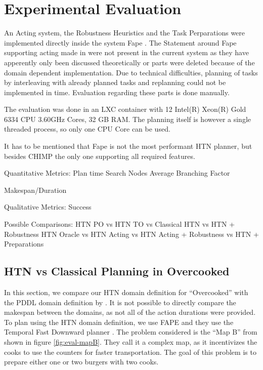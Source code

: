 \section{Experimental Evaluation}\label{sec:evaluation}

An Acting system, the Robustness Heuristics and the Task Perparations were implemented directly inside the system Fape \citep{bit-monnotFAPEConstraintbasedPlanner2020}.
The Statement around Fape supporting acting made in \cite{bit-monnotTemporalHierarchicalModels2016a} were not present in the current system as they have apperently only been discussed theoretically or parts were deleted because of the domain dependent implementation.
Due to technical difficulties, planning of tasks by interleaving with already planned tasks and replanning could not be implemented in time.
Evaluation regarding these parts is done manually.

The evaluation was done in an LXC container with 12 Intel(R) Xeon(R) Gold 6334 CPU 3.60GHz Cores, 32 GB RAM.
The planning itself is however a single threaded process, so only one CPU Core can be used.

It has to be mentioned that Fape is not the most performant HTN planner, but besides CHIMP the only one supporting all required features.

Quantitative Metrics:
Plan time
Search Nodes
Average Branching Factor

Makespan/Duration

Qualitative Metrics:
Success

Possible Comparisons:
HTN PO vs HTN TO vs Classical \citep{yuxinliuPlanningOvercookedGame2020}
HTN vs HTN + Robustness
HTN Oracle vs HTN Acting vs HTN Acting + Robustness vs HTN + Preparations


\subsection{HTN vs Classical Planning in Overcooked}


In this section, we compare our HTN domain definition for ``Overcooked'' with the PDDL domain definition by \cite{yuxinliuPlanningOvercookedGame2020}.
It is not possible to directly compare the makespan between the domains, as not all of the action durations were provided.
To plan using the HTN domain definition, we use FAPE \citep{bit-monnotTemporalHierarchicalModels2016a} and they use the Temporal Fast Downward planner \citep{eyerichUsingContextenhancedAdditive2009}.
The problem considered is the ``Map B'' from \cite{yuxinliuPlanningOvercookedGame2020} shown in figure \ref{fig:eval-mapB}.
They call it a complex map, as it incentivizes the cooks to use the counters for faster transportation.
The goal of this problem is to prepare either one or two burgers with two cooks.


